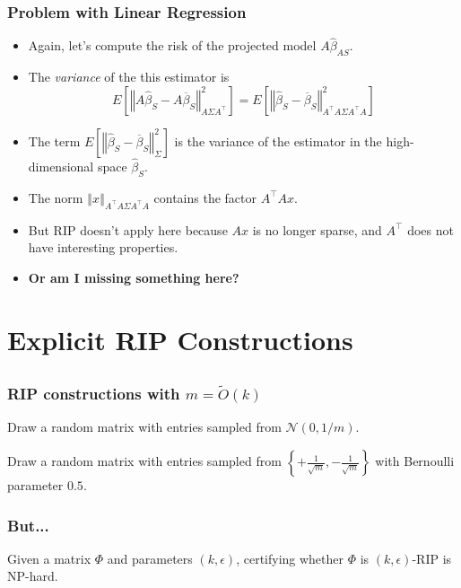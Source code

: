 \documentclass[aspectratio=34]{beamer}
\theoremstyle{plain}
\begin{document}
\begin{frame}
\frametitle{Problem with Linear Regression}
\begin{itemize}
    \item Again, let's compute the risk of the projected model $A\widehat{\beta}_{AS}$.
    \item The \emph{variance} of the this estimator is
\[
E\left[\left\Vert A\widehat{\beta}_{S}-A\overline{\beta}_{S}\right\Vert _{A\Sigma A^{\top}}^{2}\right]=E\left[\left\Vert \widehat{\beta}_{S}-\overline{\beta}_{S}\right\Vert _{A^{\top}A\Sigma A^{\top}A}^{2}\right]
\]
    \item The term $E\left[\left\Vert \widehat{\beta}_{S}-\overline{\beta}_{S}\right\Vert _{\Sigma}^{2}\right]$ is the variance of the estimator in the high-dimensional space $\widehat{\beta}_S$.
    \item The norm $\left\Vert x \right\Vert_{A^\top A \Sigma A^\top A}$ contains the factor $A^\top Ax$.
    \item But RIP doesn't apply here because $Ax$ is no longer sparse, and $A^\top$ does not have interesting properties.
    \item \textbf{Or am I missing something here?}
\end{itemize}
\end{frame}

\section{Explicit RIP Constructions}

\subsection{}
\begin{frame}
\frametitle{RIP constructions with $m = \tilde{O}(k)$}
Draw a random matrix with entries sampled from $\mathcal{N}(0,1/m)$.

Draw a random matrix with entries sampled from $\left\{+\frac{1}{\sqrt{m}}, -\frac{1}{\sqrt{m}}\right\}$ with Bernoulli parameter $0.5$. 
\end{frame}

\begin{frame}
\frametitle{But...}
\begin{theorem}
Given a matrix $\Phi$ and parameters $(k,\epsilon)$, certifying whether $\Phi$ is $(k,\epsilon)$-RIP is NP-hard. 
\end{theorem}
\end{frame}
\end{document}
